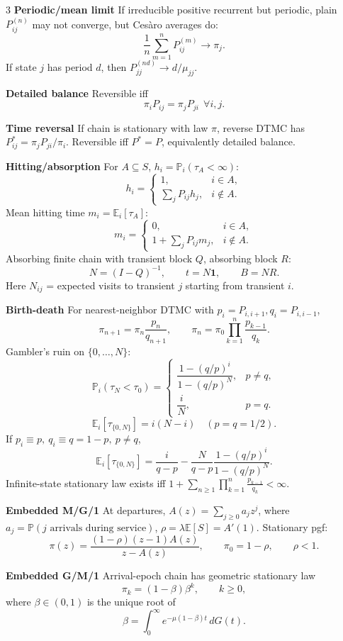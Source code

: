 \documentclass[a4paper,8pt,fleqn]{extarticle}
\newcommand{\E}{\mathbb{E}}
\newcommand{\PP}{\mathbb{P}}
\newcommand{\1}{\mathbf{1}}
\newcommand{\sub}[1]{\textbf{#1} }
\begin{document}
\begin{multicols}{3}
\sub{Periodic/mean limit} If irreducible positive recurrent but periodic, plain \(P_{ij}^{(n)}\) may not converge, but Ces\`aro averages do:
\[
\frac1n\sum_{m=1}^n P_{ij}^{(m)}\to \pi_j.
\]
If state \(j\) has period \(d\), then \(P_{jj}^{(nd)}\to d/\mu_{jj}\).

\sub{Detailed balance} Reversible iff
\[
\pi_iP_{ij}=\pi_jP_{ji}\ \ \forall i,j.
\]

\sub{Time reversal} If chain is stationary with law \(\pi\), reverse DTMC has \(P^*_{ij}=\pi_jP_{ji}/\pi_i\). Reversible iff \(P^*=P\), equivalently detailed balance.

\sub{Hitting/absorption} For \(A\subseteq S\), \(h_i=\PP_i(\tau_A<\infty)\):
\[
h_i=
\begin{cases}
1,&i\in A,\\
\sum_j P_{ij}h_j,&i\notin A.
\end{cases}
\]
Mean hitting time \(m_i=\E_i[\tau_A]\):
\[
m_i=
\begin{cases}
0,&i\in A,\\
1+\sum_jP_{ij}m_j,&i\notin A.
\end{cases}
\]
Absorbing finite chain with transient block \(Q\), absorbing block \(R\):
\[
N=(I-Q)^{-1},\qquad t=N\mathbf 1,\qquad B=NR.
\]
Here \(N_{ij}\) = expected visits to transient \(j\) starting from transient \(i\).

\sub{Birth-death} For nearest-neighbor DTMC with \(p_i=P_{i,i+1},q_i=P_{i,i-1}\),
\[
\pi_{n+1}=\pi_n\frac{p_n}{q_{n+1}},\qquad
\pi_n=\pi_0\prod_{k=1}^n \frac{p_{k-1}}{q_k}.
\]
Gambler's ruin on \(\{0,\dots,N\}\):
\[
\PP_i(\tau_N<\tau_0)=
\begin{cases}
\dfrac{1-(q/p)^i}{1-(q/p)^N},&p\ne q,\\[0.7ex]
\dfrac{i}{N},&p=q.
\end{cases}
\]
\[
\E_i[\tau_{\{0,N\}}]=i(N-i)\quad (p=q=1/2).
\]
If \(p_i\equiv p,\ q_i\equiv q=1-p,\ p\ne q\),
\[
\E_i[\tau_{\{0,N\}}]=\frac{i}{q-p}-\frac{N}{q-p}\frac{1-(q/p)^i}{1-(q/p)^N}.
\]
Infinite-state stationary law exists iff \(1+\sum_{n\ge1}\prod_{k=1}^n\frac{p_{k-1}}{q_k}<\infty\).

\sub{Embedded M/G/1} At departures, \(A(z)=\sum_{j\ge0}a_j z^j\), where \(a_j=\PP(j \text{ arrivals during service})\), \(\rho=\lambda\E[S]=A'(1)\). Stationary pgf:
\[
\pi(z)=\frac{(1-\rho)(z-1)A(z)}{z-A(z)},\qquad \pi_0=1-\rho,\qquad \rho<1.
\]

\sub{Embedded G/M/1} Arrival-epoch chain has geometric stationary law
\[
\pi_k=(1-\beta)\beta^k,\qquad k\ge0,
\]
where \(\beta\in(0,1)\) is the unique root of
\[
\beta=\int_0^\infty e^{-\mu(1-\beta)t}\,dG(t).
\]


\end{multicols}
\end{document}

